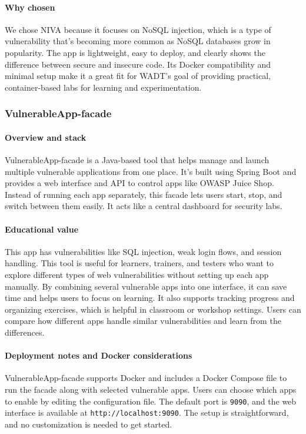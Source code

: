 \documentclass[12pt]{article}
\begin{document}
\paragraph{Why chosen}
We chose NIVA because it focuses on NoSQL injection, which is a type of vulnerability that’s becoming more common as NoSQL databases grow in popularity. The app is lightweight, easy to deploy, and clearly shows the difference between secure and insecure code. Its Docker compatibility and minimal setup make it a great fit for WADT’s goal of providing practical, container-based labs for learning and experimentation.

\subsubsection{VulnerableApp-facade}

\paragraph{Overview and stack}
VulnerableApp-facade is a Java-based tool that helps manage and launch multiple vulnerable applications from one place. It’s built using Spring Boot and provides a web interface and API to control apps like OWASP Juice Shop. Instead of running each app separately, this facade lets users start, stop, and switch between them easily. It acts like a central dashboard for security labs.

\paragraph{Educational value}
This app has vulnerabilities like SQL injection, weak login flows, and session handling. This tool is useful for learners, trainers, and testers who want to explore different types of web vulnerabilities without setting up each app manually. By combining several vulnerable apps into one interface, it can save time and helps users to focus on learning. It also supports tracking progress and organizing exercises, which is helpful in classroom or workshop settings. Users can compare how different apps handle similar vulnerabilities and learn from the differences.

\paragraph{Deployment notes and Docker considerations}
VulnerableApp-facade supports Docker and includes a Docker Compose file to run the facade along with selected vulnerable apps. Users can choose which apps to enable by editing the configuration file. The default port is \texttt{9090}, and the web interface is available at \texttt{http://localhost:9090}. The setup is straightforward, and no customization is needed to get started. 
\end{document}
